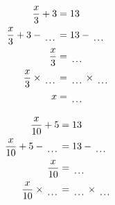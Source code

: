 \documentclass[12pt]{article}
\newcounter{minipagecount}
\begin{document}
\begin{multicols}{2}
\begin{minipage}[t]{0.45\textwidth}
    \raggedright %
    \begin{align*} %
        \frac{x}{3} + 3 &= 13\\
        \frac{x}{3} + 3 - \dotuline{\hspace{5mm}} &= 13 - \dotuline{\hspace{5mm}}\\
        \frac{x}{3} &= \dotuline{\hspace{5mm}}\\
        \frac{x}{3} \times\dotuline{\hspace{5mm}} &= \dotuline{\hspace{5mm}} \times\dotuline{\hspace{5mm}}\\
        x &= \dotuline{\hspace{5mm}}\\
    \end{align*}
\end{minipage} %
\noindent{(\theminipagecount)}\hspace{0.1mm} %
\begin{minipage}[t]{0.45\textwidth} %
    \vspace{-26pt}  %
    \raggedright %
    \begin{align*} %
        \frac{x}{10} + 5 &= 13\\
        \frac{x}{10} + 5 - \dotuline{\hspace{5mm}} &= 13 - \dotuline{\hspace{5mm}}\\
        \frac{x}{10} &= \dotuline{\hspace{5mm}}\\
        \frac{x}{10} \times\dotuline{\hspace{5mm}} &= \dotuline{\hspace{5mm}} \times\dotuline{\hspace{5mm}}\\

\end{align*}
\end{minipage}
\end{multicols}
\end{document}
